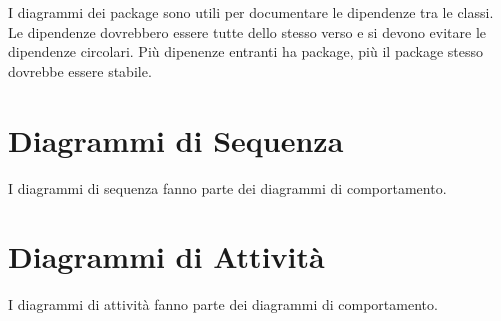 I diagrammi dei package sono utili per documentare le dipendenze tra le classi. 
Le dipendenze dovrebbero essere tutte dello stesso verso e si devono evitare le dipendenze circolari. 
Più dipenenze entranti ha package, più il package stesso dovrebbe essere stabile.

\section{Diagrammi di Sequenza}
I diagrammi di sequenza fanno parte dei diagrammi di comportamento. 


\section{Diagrammi di Attività}
I diagrammi di attività fanno parte dei diagrammi di comportamento. 
